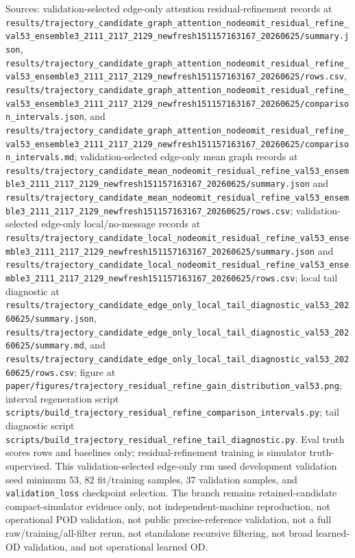 \begin{table}[t]
\scriptsize Sources: validation-selected edge-only attention residual-refinement records at \nolinkurl{results/trajectory_candidate_graph_attention_nodeomit_residual_refine_val53_ensemble3_2111_2117_2129_newfresh151157163167_20260625/summary.json}, \nolinkurl{results/trajectory_candidate_graph_attention_nodeomit_residual_refine_val53_ensemble3_2111_2117_2129_newfresh151157163167_20260625/rows.csv}, \nolinkurl{results/trajectory_candidate_graph_attention_nodeomit_residual_refine_val53_ensemble3_2111_2117_2129_newfresh151157163167_20260625/comparison_intervals.json}, and \nolinkurl{results/trajectory_candidate_graph_attention_nodeomit_residual_refine_val53_ensemble3_2111_2117_2129_newfresh151157163167_20260625/comparison_intervals.md}; validation-selected edge-only mean graph records at \nolinkurl{results/trajectory_candidate_mean_nodeomit_residual_refine_val53_ensemble3_2111_2117_2129_newfresh151157163167_20260625/summary.json} and \nolinkurl{results/trajectory_candidate_mean_nodeomit_residual_refine_val53_ensemble3_2111_2117_2129_newfresh151157163167_20260625/rows.csv}; validation-selected edge-only local/no-message records at \nolinkurl{results/trajectory_candidate_local_nodeomit_residual_refine_val53_ensemble3_2111_2117_2129_newfresh151157163167_20260625/summary.json} and \nolinkurl{results/trajectory_candidate_local_nodeomit_residual_refine_val53_ensemble3_2111_2117_2129_newfresh151157163167_20260625/rows.csv}; local tail diagnostic at \nolinkurl{results/trajectory_candidate_edge_only_local_tail_diagnostic_val53_20260625/summary.json}, \nolinkurl{results/trajectory_candidate_edge_only_local_tail_diagnostic_val53_20260625/summary.md}, and \nolinkurl{results/trajectory_candidate_edge_only_local_tail_diagnostic_val53_20260625/rows.csv}; figure at \nolinkurl{paper/figures/trajectory_residual_refine_gain_distribution_val53.png}; interval regeneration script \nolinkurl{scripts/build_trajectory_residual_refine_comparison_intervals.py}; tail diagnostic script \nolinkurl{scripts/build_trajectory_residual_refine_tail_diagnostic.py}. Eval truth scores rows and baselines only; residual-refinement training is simulator truth-supervised. This validation-selected edge-only run used development validation seed minimum 53, 82 fit/training samples, 37 validation samples, and \texttt{validation\_loss} checkpoint selection. The branch remains retained-candidate compact-simulator evidence only, not independent-machine reproduction, not operational POD validation, not public precise-reference validation, not a full raw/training/all-filter rerun, not standalone recursive filtering, not broad learned-OD validation, and not operational learned OD.
\end{table}